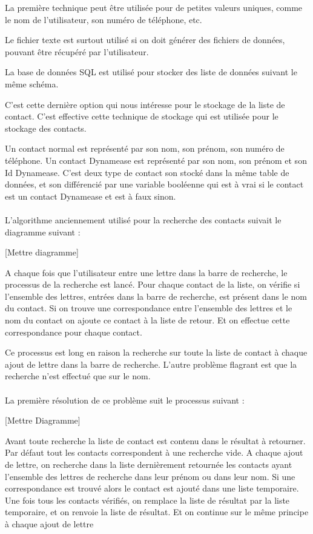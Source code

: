La première technique peut être utilisée pour de petites valeurs uniques, comme le nom de l'utilisateur, son numéro de téléphone, etc.

Le fichier texte est surtout utilisé si on doit générer des fichiers de données, pouvant être récupéré par l'utilisateur.

La base de données SQL est utilisé pour stocker des liste de données suivant le même schéma.

C'est cette dernière option qui nous intéresse pour le stockage de la liste de contact. C'est effective cette technique de stockage qui est utilisée pour le stockage des contacts.

Un contact normal est représenté par son nom, son prénom, son numéro de téléphone. Un contact Dynamease est représenté par son nom, son prénom et son Id Dynamease. C'est deux type de contact son stocké dans la même table de données, et son différencié par une variable booléenne qui est à vrai si le contact est un contact Dynamease et est à faux sinon.\\\\

L'algorithme anciennement utilisé pour la recherche des contacts suivait le diagramme suivant :

[Mettre diagramme]

A chaque fois que l'utilisateur entre une lettre dans la barre de recherche, le processus de la recherche est lancé. Pour chaque contact de la liste, on vérifie si l'ensemble des lettres, entrées dans la barre de recherche, est présent dans le nom du contact. Si on trouve une correspondance entre l'ensemble des lettres et le nom du contact on ajoute ce contact à la liste de retour. Et on effectue cette correspondance pour chaque contact.

Ce processus est long en raison la recherche sur toute la liste de contact à chaque ajout de lettre dans la barre de recherche. L'autre problème flagrant est que la recherche n'est effectué que sur le nom.\\\\

La première résolution de ce problème suit le processus suivant :

[Mettre Diagramme]

Avant toute recherche la liste de contact est contenu dans le résultat à retourner. Par défaut tout les contacts correspondent à une recherche vide. A chaque ajout de lettre, on recherche dans la liste dernièrement retournée les contacts ayant l'ensemble des lettres de recherche dans leur prénom ou dans leur nom. Si une correspondance est trouvé alors le contact est ajouté dans une liste temporaire. Une fois tous les contacts vérifiés, on remplace la liste de résultat par la liste temporaire, et on renvoie la liste de résultat. Et on continue sur le même principe à chaque ajout de lettre\\\\

